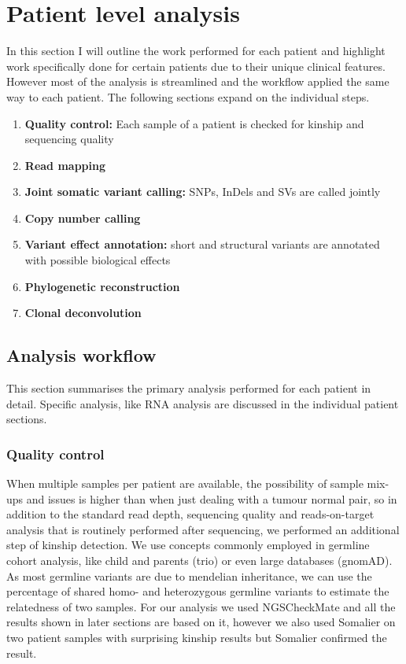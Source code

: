 \section{Patient level analysis}
\label{cascade-sec:patientLevel}
In this section I will outline the work performed for each patient and highlight work specifically done for certain patients due to their unique clinical features. However most of the analysis is streamlined and the workflow applied the same way to each patient. The following sections expand on the individual steps.
\begin{enumerate}
\item \textbf{Quality control:} Each sample of a patient is checked for kinship and sequencing quality
\item \textbf{Read mapping}
\item \textbf{Joint somatic variant calling:} SNPs, InDels and SVs are called jointly
\item \textbf{Copy number calling}
\item \textbf{Variant effect annotation:} short and structural variants are annotated with possible biological effects
\item \textbf{Phylogenetic reconstruction}
\item \textbf{Clonal deconvolution}
\end{enumerate}

\subsection{Analysis workflow}
\label{cascade-sec:workflow}
This section summarises the primary analysis performed for each patient in detail. Specific analysis, like RNA analysis are discussed in the individual patient sections. 

\subsubsection{Quality control}
\label{cascade-sec:qc}
When multiple samples per patient are available, the possibility of sample mix-ups and issues is higher than when just dealing with a tumour normal pair, so in addition to the standard read depth, sequencing quality and reads-on-target analysis that is routinely performed after sequencing, we performed an additional step of kinship detection. We use concepts commonly employed in germline cohort analysis, like child and parents (trio) or even large databases (gnomAD). As most germline variants are due to mendelian inheritance, we can use the percentage of shared homo- and heterozygous germline variants to estimate the relatedness of two samples. For our analysis we used NGSCheckMate \cite{Lee2017} and all the results shown in later sections are based on it, however we also used Somalier \cite{Pedersen2020} on two patient samples with surprising kinship results but Somalier confirmed the result.

